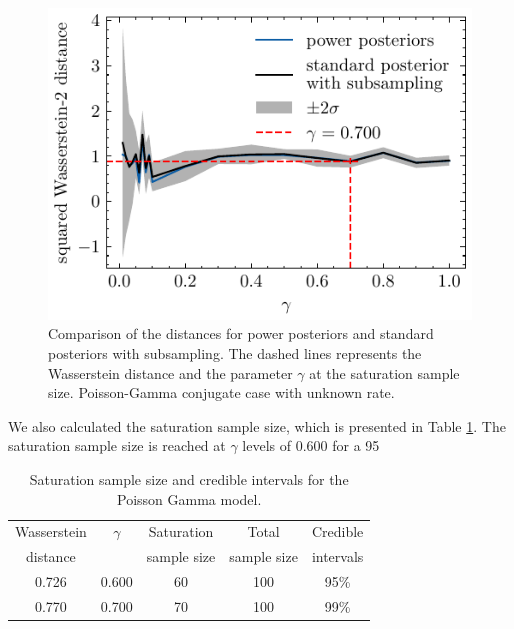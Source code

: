 \documentclass[12pt]{article}
\begin{document}
\begin{figure}
\begin{center}
\includegraphics{imgs/poisson_gamma_99.pdf}
\end{center}
\caption{Comparison of the distances for power posteriors and standard posteriors with subsampling. The dashed lines represents the Wasserstein distance and the parameter $\gamma$ at the saturation sample size. Poisson-Gamma conjugate case with unknown rate.}\label{fig:poisson_gamma_sub}
\end{figure}

We also calculated the saturation sample size, which is presented in Table \cref{tab:satsize_poi}. The saturation sample size is reached at \(\gamma\) levels of 0.600 for a 95%

\begin{table}[h]
	\caption{Saturation sample size and credible intervals for the Poisson Gamma model.}
	\renewcommand{\arraystretch}{1.5}
	\centering
	\begin{tabular}{ccccc} 
		\hline
		Wasserstein & $\gamma$ & Saturation & Total & Credible\\
		distance& &sample size& sample size& intervals\\ [0.5ex] 
		\hline 
		0.726 & 0.600 & 60 & 100 & 95\%\\
		0.770 & 0.700 & 70 & 100 & 99\% \\
		\hline
	\end{tabular}
	\label{tab:satsize_poi}
\end{table}
\end{document}
